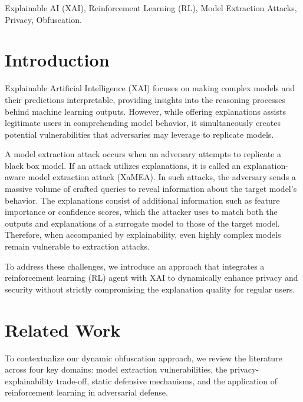 \documentclass[conference]{IEEEtran}
\begin{document}
\begin{IEEEkeywords}
Explainable AI (XAI), Reinforcement Learning (RL), Model Extraction Attacks, Privacy, Obfuscation.
\end{IEEEkeywords}

\section{Introduction}
Explainable Artificial Intelligence (XAI) focuses on making complex models and their predictions interpretable, providing insights into the reasoning processes behind machine learning outputs. However, while offering explanations assists legitimate users in comprehending model behavior, it simultaneously creates potential vulnerabilities that adversaries may leverage to replicate models.

A model extraction attack occurs when an adversary attempts to replicate a black box model. If an attack utilizes explanations, it is called an explanation-aware model extraction attack (XaMEA). In such attacks, the adversary sends a massive volume of crafted queries to reveal information about the target model's behavior. The explanations consist of additional information such as feature importance or confidence scores, which the attacker uses to match both the outputs and explanations of a surrogate model to those of the target model. Therefore,  when accompanied by explainability, even highly complex models remain vulnerable to extraction attacks.

To address these challenges, we introduce an approach that integrates a reinforcement learning (RL) agent with XAI to dynamically enhance privacy and security without strictly compromising the explanation quality for regular users.

\section{Related Work}
To contextualize our dynamic obfuscation approach, we review the literature across four key domains: model extraction vulnerabilities, the privacy-explainability trade-off, static defensive mechanisms, and the application of reinforcement learning in adversarial defense.
\end{document}
